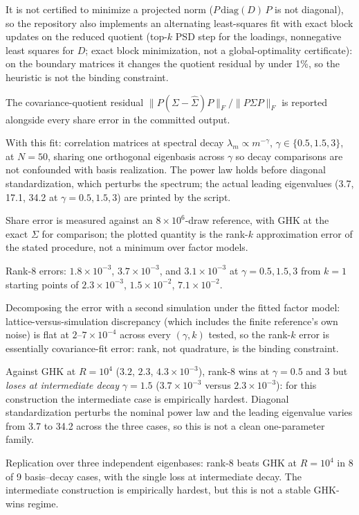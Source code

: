 \documentclass[12pt]{article}
\theoremstyle{remark}
\begin{document}
It is not certified to minimize a projected norm ($P\,\mathrm{diag}(D)\,P$
is not diagonal), so the repository also implements an alternating least-squares fit with
exact block updates on the reduced quotient (top-$k$ PSD step for the
loadings, nonnegative least squares for $D$; exact block minimization, not
a global-optimality certificate): on the boundary matrices it changes the
quotient residual by under 1\%, so the heuristic is not the binding
constraint.

The covariance-quotient residual $\|P(\Sigma -
\hat\Sigma)P\|_F / \|P\Sigma P\|_F$ is reported alongside every share
error in the committed output.

With this fit: correlation matrices at spectral decay $\lambda_m \propto
m^{-\gamma}$, $\gamma \in \{0.5, 1.5, 3\}$, at $N=50$, sharing one
orthogonal eigenbasis across $\gamma$ so decay comparisons are not
confounded with basis realization. The power law holds before diagonal
standardization, which perturbs the spectrum; the actual leading eigenvalues
(3.7, 17.1, 34.2 at $\gamma = 0.5, 1.5, 3$) are printed by the script.

Share error is measured against an $8\times10^6$-draw reference, with GHK
at the exact $\Sigma$ for comparison; the plotted quantity is the rank-$k$
approximation error of the stated procedure, not a minimum over factor
models.

Rank-8 errors: $1.8\times10^{-3}$, $3.7\times10^{-3}$, and
$3.1\times10^{-3}$ at $\gamma = 0.5, 1.5, 3$ from $k=1$ starting points of
$2.3\times10^{-3}$, $1.5\times10^{-2}$, $7.1\times10^{-2}$.

Decomposing the error with a second simulation under the fitted factor model:
lattice-versus-simulation discrepancy (which includes the finite
reference's own noise) is flat at $2$--$7\times10^{-4}$ across every $(\gamma,
k)$ tested, so the rank-$k$ error is essentially covariance-fit error:
rank, not quadrature, is the binding constraint.

Against GHK at $R = 10^4$
($3.2$, $2.3$, $4.3\times10^{-3}$), rank-8 wins at $\gamma = 0.5$ and $3$
but \emph{loses at intermediate decay} $\gamma = 1.5$
($3.7\times10^{-3}$ versus $2.3\times10^{-3}$): for this construction the
intermediate case is empirically hardest. Diagonal standardization perturbs
the nominal power law and the leading eigenvalue varies from 3.7 to 34.2
across the three cases, so this is not a clean one-parameter family.

Replication over three independent eigenbases: rank-8 beats GHK at $R=10^4$
in 8 of 9 basis--decay cases, with the single loss at intermediate decay.
The intermediate construction is empirically hardest, but this is not a
stable GHK-wins regime.
\end{document}

